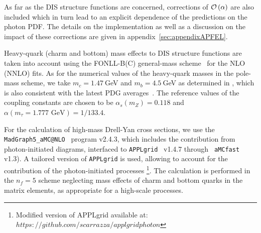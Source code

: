 As far as the DIS structure functions are concerned, corrections of
$\mathcal{O}\left( \alpha\right)$ are also included which in turn lead to an
explicit dependence of the predictions on the photon PDF.  The details
on the implementation as well as a discussion on the impact of these
corrections are given in appendix~\ref{sec:appendixAPFEL}.

Heavy-quark (charm and bottom) mass effects to DIS structure functions
are taken into account using the FONLL-B(C) general-mass
scheme~\cite{Forte:2010ta} for the NLO (NNLO) fits.
%
As for the numerical values of the heavy-quark masses in the pole-mass
scheme, we take $m_c=1.47~$GeV and $m_b=4.5~$GeV as determined in \cite{Abramowicz:2015mha}, which is also 
consistent with the latest PDG averages~\cite{Agashe:2014kda}.
%
The reference values of the coupling constants are chosen to be
$\alpha_s(m_Z)=0.118$ and $\alpha(m_\tau=1.777\mbox{ GeV})=1/133.4$.

For the calculation of high-mass Drell-Yan cross sections, we use the
{\tt MadGraph5{\_}aMC@NLO}~\cite{Alwall:2014hca} program v2.4.3, which
includes the contribution from photon-initiated diagrams, interfaced
to {\tt APPLgrid}~\cite{Carli:2010rw} v1.4.7 through {\tt
  aMCfast}~\cite{amcfast} v1.3).
%
A tailored version of {\tt APPLgrid} is used, allowing to account for
the contribution of the photon-initiated processes \footnote{Modified version of APPLgrid available at: $https://github.com/scarrazza/applgridphoton$}.
%
The calculation is performed in the $n_f=5$ scheme neglecting mass
effects of charm and bottom quarks in the matrix elements, as
appropriate for a high-scale processes.

